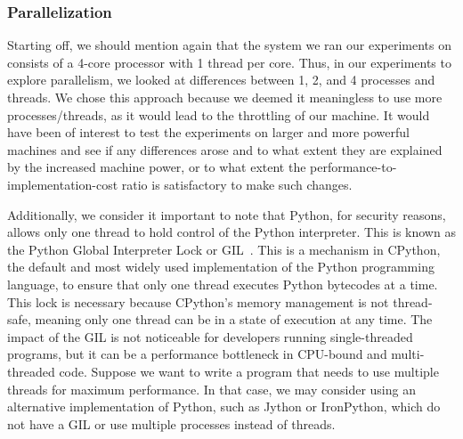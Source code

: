 \subsubsection{Parallelization}

Starting off, we should mention again that the system we ran our experiments on consists of a 4-core processor with 1 thread per core. 
Thus, in our experiments to explore parallelism, we looked at differences between 1, 2, and 4 processes and threads. 
We chose this approach because we deemed it meaningless to use more processes/threads, as it would lead to the throttling of our machine. 
It would have been of interest to test the experiments on larger and more powerful machines and see if any differences arose 
and to what extent they are explained by the increased machine power, or to what extent the performance-to-implementation-cost ratio is satisfactory 
to make such changes.

Additionally, we consider it important to note that Python, for security reasons, allows only one thread to hold control of the Python interpreter. 
This is known as the Python Global Interpreter Lock or GIL~\cite{PythonGIL}. This is a mechanism in CPython, 
the default and most widely used implementation of the 
Python programming language, to ensure that only one thread executes Python bytecodes at a time. 
This lock is necessary because CPython's memory management is not thread-safe, meaning only one thread can be in a state of execution at any time. 
The impact of the GIL is not noticeable for developers running single-threaded programs, 
but it can be a performance bottleneck in CPU-bound and multi-threaded code. Suppose we want to write a program that needs to use multiple threads 
for maximum performance. In that case, we may consider using an alternative implementation of Python, such as Jython or IronPython, 
which do not have a GIL or use multiple processes instead of threads.

